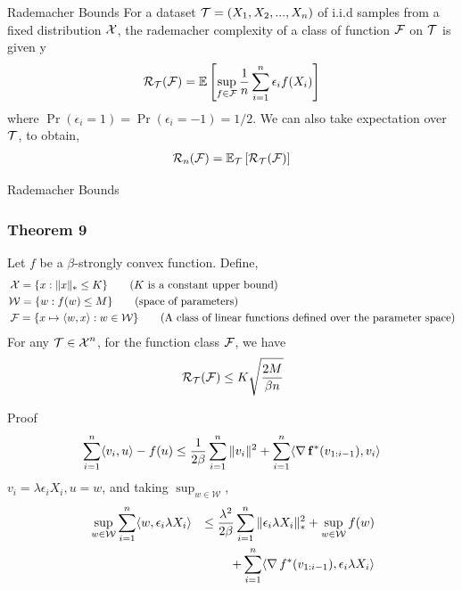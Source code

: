 \begin{frame}{Rademacher Bounds}
  For a dataset $\operatorname{\mathcal{T}}=(X_1,X_2,...,X_n)$ of i.i.d samples from a fixed distribution $\operatorname{\mathcal{X}}$, the rademacher complexity of a class of function $\operatorname{\mathcal{F}}$ on $\operatorname{\mathcal{T}}$ is given y
  \begin{align*}
    \operatorname{\mathcal{R}}_{\operatorname{\mathcal{T}}}(\operatorname{\mathcal{F}}) = \operatorname{\mathbb{E}} \left[ \sup_{f \in \operatorname{\mathcal{F}}} \frac{1}{n}\sum_{i=1}^n \epsilon_i f(X_i) \right]
  \end{align*}
  where $\Pr(\epsilon_i = 1) = \Pr(\epsilon_i = -1) = 1/2$.
  We can also take expectation over $\operatorname{\mathcal{T}}$, to obtain,
  \begin{align*}
    \operatorname{\mathcal{R}}_n(\operatorname{\mathcal{F}})=\operatorname{\mathbb{E}}_{\operatorname{\mathcal{T}}}\left[\operatorname{\mathcal{R}}_{\operatorname{\mathcal{T}}}(\operatorname{\mathcal{F}})\right]
  \end{align*}
\end{frame}

\begin{frame}{Rademacher Bounds}
    \frametitle{Theorem 9}
    Let $f$ be a $\beta$-strongly convex function. Define,
    \begin{align*}
      & \operatorname{\mathcal{X}} = \{ x : \|x\|_{*} \le K \} \tag{$K$ is a constant upper bound}\\
      & \mathcal{W} = \{w : f(w) \le M\} \tag{space of parameters}\\
      & \operatorname{\mathcal{F}} = \{ x \mapsto \langle {w} , {x} \rangle : w \in \mathcal{W} \} \tag{A class of linear functions defined over the parameter space}
    \end{align*}
    For any $\operatorname{\mathcal{T}} \in \operatorname{\mathcal{X}}^n$, for the function class $\operatorname{\mathcal{F}}$, we have
    \begin{align*}
      & \operatorname{\mathcal{R}}_{\operatorname{\mathcal{T}}}(\operatorname{\mathcal{F}}) \le K\sqrt{\frac{2M}{\beta n}} \\
    \end{align*}
\end{frame}

\begin{frame}{Proof}
    \begin{align*}
      \sum_{i=1}^n \langle {v_i} , {u} \rangle - f(u) \le \frac{1}{2\beta} \sum_{i=1}^n \|v_i\|^2 + \sum_{i=1}^n \langle {\operatorname{\nabla}{\operatorname{\mathbf{f}}}^{*}(v_{1:i-1})} , {v_i} \rangle
    \end{align*}
    $v_i=\lambda\epsilon_i X_i,u=w$, and taking $\sup_{w \in \mathcal{W}}$,
    \begin{alignat*}{2}
      & \sup_{w \in \mathcal{W}} \sum_{i=1}^n \langle {w} , {\epsilon_i \lambda X_i} \rangle & \le \frac{\lambda^2}{2\beta}\sum_{i=1}^n \|\epsilon_i \lambda X_i\|_{*}^2 + \sup_{w \in \mathcal{W}} f(w) \\
      & & + \sum_{i=1}^n \langle {\operatorname{\nabla}{f}^{*}(v_{1:i-1})} , {\epsilon_i \lambda X_i} \rangle
    \end{alignat*}
\end{frame}

